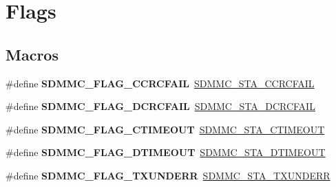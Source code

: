 \hypertarget{group___s_d_m_m_c___l_l___flags}{}\section{Flags}
\label{group___s_d_m_m_c___l_l___flags}
\subsection*{Macros}
\begin{DoxyCompactItemize}
\item 
\mbox{\label{group___s_d_m_m_c___l_l___flags_ga0b938ed52b67b0f077d592c2c19adb31}} 
\#define {\bfseries S\+D\+M\+M\+C\+\_\+\+F\+L\+A\+G\+\_\+\+C\+C\+R\+C\+F\+A\+IL}~\mbox{\hyperlink{group___peripheral___registers___bits___definition_gae302f98431500f3be2d22e8a2b1997c2}{S\+D\+M\+M\+C\+\_\+\+S\+T\+A\+\_\+\+C\+C\+R\+C\+F\+A\+IL}}
\item 
\mbox{\label{group___s_d_m_m_c___l_l___flags_ga2695892428cd4b4a20403fd6cd89fa4e}} 
\#define {\bfseries S\+D\+M\+M\+C\+\_\+\+F\+L\+A\+G\+\_\+\+D\+C\+R\+C\+F\+A\+IL}~\mbox{\hyperlink{group___peripheral___registers___bits___definition_ga512955c76ca837d151737835bfe0b50a}{S\+D\+M\+M\+C\+\_\+\+S\+T\+A\+\_\+\+D\+C\+R\+C\+F\+A\+IL}}
\item 
\mbox{\label{group___s_d_m_m_c___l_l___flags_gab73d5a64eab19f6c38f6927bd4998579}} 
\#define {\bfseries S\+D\+M\+M\+C\+\_\+\+F\+L\+A\+G\+\_\+\+C\+T\+I\+M\+E\+O\+UT}~\mbox{\hyperlink{group___peripheral___registers___bits___definition_ga2a1bea5b39c521d3338af0a0a2f4f465}{S\+D\+M\+M\+C\+\_\+\+S\+T\+A\+\_\+\+C\+T\+I\+M\+E\+O\+UT}}
\item 
\mbox{\label{group___s_d_m_m_c___l_l___flags_ga47d04b88b6c222ae60abc74909c08900}} 
\#define {\bfseries S\+D\+M\+M\+C\+\_\+\+F\+L\+A\+G\+\_\+\+D\+T\+I\+M\+E\+O\+UT}~\mbox{\hyperlink{group___peripheral___registers___bits___definition_ga0330b309e3b0256dab5ae86898b4304d}{S\+D\+M\+M\+C\+\_\+\+S\+T\+A\+\_\+\+D\+T\+I\+M\+E\+O\+UT}}
\item 
\mbox{\label{group___s_d_m_m_c___l_l___flags_ga76fca4d831e24339344625e1f680f929}} 
\#define {\bfseries S\+D\+M\+M\+C\+\_\+\+F\+L\+A\+G\+\_\+\+T\+X\+U\+N\+D\+E\+RR}~\mbox{\hyperlink{group___peripheral___registers___bits___definition_gaa3c8e7dcc980af5b6b74e20832de070a}{S\+D\+M\+M\+C\+\_\+\+S\+T\+A\+\_\+\+T\+X\+U\+N\+D\+E\+RR}}

\end{DoxyCompactItemize}
